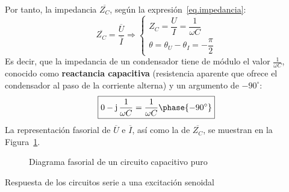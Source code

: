 \documentclass[11pt]{book} %
\makeatletter
\numberwithin{dummy}{section}
\theoremstyle{ocrenumbox}
\theoremstyle{blacknumex}
\theoremstyle{blacknumbox}
\theoremstyle{ocrenum}
\renewcommand{\section}{\@startsection{section}{1}{\z@}
{-4ex \@plus -1ex \@minus -.4ex}
{1ex \@plus.2ex }
{\normalfont\large\sffamily\bfseries}}
\newlength\esp
\makeatother
\begin{document}
	Por tanto, la impedancia $\overline{Z_C}$, según la expresión~\eqref{eq.impedancia}:
	\begin{equation*}
		\overline{Z_C}=\dfrac{\overline{U}}{\overline{I}}\Rightarrow
		\begin{cases}
			Z_C=\dfrac{U}{I}=\dfrac{1}{\omega C}\\
			\theta=\theta_U-\theta_I=-\dfrac{\pi}{2}
		\end{cases}
	\end{equation*}
	Es decir, que la impedancia de un condensador tiene de módulo el valor $\frac{1}{\omega C}$, conocido como \textbf{reactancia capacitiva} (resistencia aparente que ofrece el condensador al paso de la corriente alterna) y un argumento de $-90^\circ$:
	\begin{equation}
		\boxed{0-\mathrm{j}\,\dfrac{1}{\omega C}=\dfrac{1}{\omega C}\phase{-90^\circ}}
	\end{equation}
	La representación fasorial de $\overline{U}$ e $\overline{I}$, así como la de $\overline{Z_C}$, se muestran en la Figura~\ref{fig.fasorCondensador}. 
	\begin{figure}[htbp]
		\centering
		\hfil
		\caption{Diagrama fasorial de un circuito capacitivo puro}
		\label{fig.fasorCondensador}
	\end{figure}
	
	\section{Respuesta de los circuitos serie a una excitación senoidal} \label{sec.respuesta_serie}
	
\end{document}

